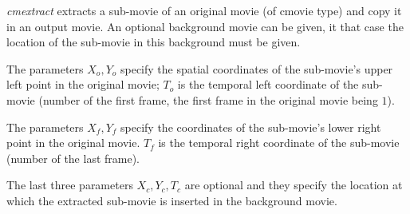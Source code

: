 {\em cmextract} extracts a sub-movie of an original movie (of cmovie type) and copy it in an output movie. 
An optional background movie can be given, it that
case the location of the sub-movie in this background must be given. 

The parameters $X_o,Y_o$ specify the spatial coordinates of the sub-movie's upper left point in the original movie;
$T_o$ is the temporal left coordinate of the sub-movie (number of the first frame, the first frame in the original movie being $1$).

The parameters $X_f,Y_f$ specify the coordinates of the sub-movie's lower right point in the original movie.
$T_f$ is the temporal right coordinate of the sub-movie (number of the last frame).

The last three parameters $X_c,Y_c,T_c$ are optional and they specify the location at which the extracted sub-movie is inserted in the background movie.


